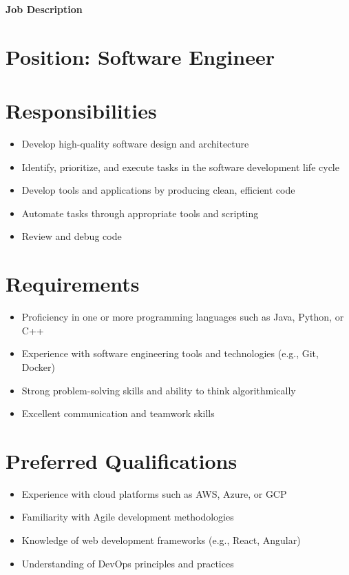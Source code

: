 \documentclass{article}
\begin{document}
\begin{center}

    
    \textbf{\huge Job Description}
\end{center}

\section*{Position: Software Engineer}

\section*{Responsibilities}
\begin{itemize}[label={}, leftmargin=*, itemsep=5pt]
    \item Develop high-quality software design and architecture
    \item Identify, prioritize, and execute tasks in the software development life cycle
    \item Develop tools and applications by producing clean, efficient code
    \item Automate tasks through appropriate tools and scripting
    \item Review and debug code
\end{itemize}

\section*{Requirements}
\begin{itemize}[label={}, leftmargin=*, itemsep=5pt]
    \item Proficiency in one or more programming languages such as Java, Python, or C++
    \item Experience with software engineering tools and technologies (e.g., Git, Docker)
    \item Strong problem-solving skills and ability to think algorithmically
    \item Excellent communication and teamwork skills
\end{itemize}

\section*{Preferred Qualifications}
\begin{itemize}[label={}, leftmargin=*, itemsep=5pt]
    \item Experience with cloud platforms such as AWS, Azure, or GCP
    \item Familiarity with Agile development methodologies
    \item Knowledge of web development frameworks (e.g., React, Angular)
    \item Understanding of DevOps principles and practices
\end{itemize}
\end{document}

